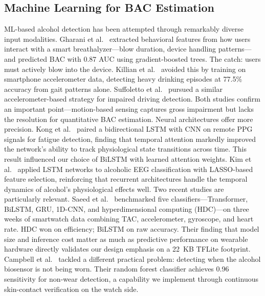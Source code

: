 \documentclass[HARVARD,Times2COL]{WileyNJDv5}
\begin{document}
\subsection{Machine Learning for BAC Estimation}
ML-based alcohol detection has been attempted through remarkably diverse input modalities. Gharani et al.~\citep{gharani2021} extracted behavioral features from how users interact with a smart breathalyzer---blow duration, device handling patterns---and predicted BAC with 0.87 AUC using gradient-boosted trees. The catch: users must actively blow into the device. Killian et al.~\citep{killian2019} avoided this by training on smartphone accelerometer data, detecting heavy drinking episodes at 77.5\% accuracy from gait patterns alone. Suffoletto et al.~\citep{suffoletto2020} pursued a similar accelerometer-based strategy for impaired driving detection. Both studies confirm an important point---motion-based sensing captures gross impairment but lacks the resolution for quantitative BAC estimation.
Neural architectures offer more precision. Kong et al.~\citep{kong2024} paired a bidirectional LSTM with CNN on remote PPG signals for fatigue detection, finding that temporal attention markedly improved the network's ability to track physiological state transitions across time. This result influenced our choice of BiLSTM with learned attention weights. Kim et al.~\citep{kim2024eeg} applied LSTM networks to alcoholic EEG classification with LASSO-based feature selection, reinforcing that recurrent architectures handle the temporal dynamics of alcohol's physiological effects well.
Two recent studies are particularly relevant. Saeed et al.~\citep{saeed2025} benchmarked five classifiers---Transformer, BiLSTM, GRU, 1D-CNN, and hyperdimensional computing (HDC)---on three weeks of smartwatch data combining TAC, accelerometer, gyroscope, and heart rate. HDC won on efficiency; BiLSTM on raw accuracy. Their finding that model size and inference cost matter as much as predictive performance on wearable hardware directly validates our design emphasis on a 22~KB TFLite footprint. Campbell et al.~\citep{biosensor2025nonwear} tackled a different practical problem: detecting when the alcohol biosensor is not being worn. Their random forest classifier achieves 0.96 sensitivity for non-wear detection, a capability we implement through continuous skin-contact verification on the watch side.
\end{document}
